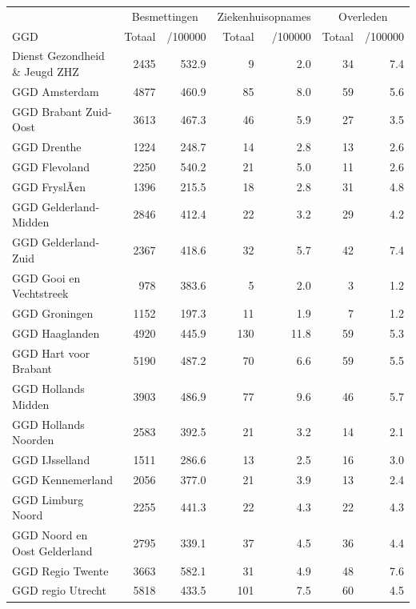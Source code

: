 \documentclass[
  english,
  man,floatsintext]{apa6}
\begin{document}
\begin{table}[H]
\centering\begingroup\fontsize{10}{12}\selectfont

\begin{threeparttable}
\begin{tabular}{lrrrrrr}
\toprule
\multicolumn{1}{c}{ } & \multicolumn{2}{c}{Besmettingen} & \multicolumn{2}{c}{Ziekenhuisopnames} & \multicolumn{2}{c}{Overleden} \\
\cmidrule(l{3pt}r{3pt}){2-3} \cmidrule(l{3pt}r{3pt}){4-5} \cmidrule(l{3pt}r{3pt}){6-7}
GGD & Totaal & /100000 & Totaal & /100000 & Totaal & /100000\\
\midrule
Dienst Gezondheid \& Jeugd ZHZ & 2435 & 532.9 & 9 & 2.0 & 34 & 7.4\\
GGD Amsterdam & 4877 & 460.9 & 85 & 8.0 & 59 & 5.6\\
GGD Brabant Zuid-Oost & 3613 & 467.3 & 46 & 5.9 & 27 & 3.5\\
GGD Drenthe & 1224 & 248.7 & 14 & 2.8 & 13 & 2.6\\
GGD Flevoland & 2250 & 540.2 & 21 & 5.0 & 11 & 2.6\\
GGD FryslÃ¢n & 1396 & 215.5 & 18 & 2.8 & 31 & 4.8\\
GGD Gelderland-Midden & 2846 & 412.4 & 22 & 3.2 & 29 & 4.2\\
GGD Gelderland-Zuid & 2367 & 418.6 & 32 & 5.7 & 42 & 7.4\\
GGD Gooi en Vechtstreek & 978 & 383.6 & 5 & 2.0 & 3 & 1.2\\
GGD Groningen & 1152 & 197.3 & 11 & 1.9 & 7 & 1.2\\
GGD Haaglanden & 4920 & 445.9 & 130 & 11.8 & 59 & 5.3\\
GGD Hart voor Brabant & 5190 & 487.2 & 70 & 6.6 & 59 & 5.5\\
GGD Hollands Midden & 3903 & 486.9 & 77 & 9.6 & 46 & 5.7\\
GGD Hollands Noorden & 2583 & 392.5 & 21 & 3.2 & 14 & 2.1\\
GGD IJsselland & 1511 & 286.6 & 13 & 2.5 & 16 & 3.0\\
GGD Kennemerland & 2056 & 377.0 & 21 & 3.9 & 13 & 2.4\\
GGD Limburg Noord & 2255 & 441.3 & 22 & 4.3 & 22 & 4.3\\
GGD Noord en Oost Gelderland & 2795 & 339.1 & 37 & 4.5 & 36 & 4.4\\
GGD Regio Twente & 3663 & 582.1 & 31 & 4.9 & 48 & 7.6\\
GGD regio Utrecht & 5818 & 433.5 & 101 & 7.5 & 60 & 4.5\\

\end{tabular}
\end{threeparttable}
\end{table}
\end{document}
